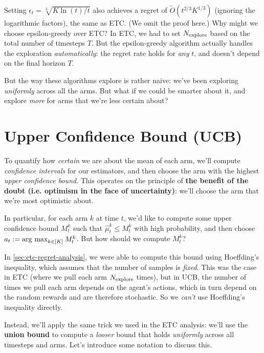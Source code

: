 \documentclass[\main/main]{subfiles}
\begin{document}
Setting $\epsilon_t = \sqrt[3]{K \ln(t)/t}$ also achieves a regret of $\tilde O(t^{2/3} K^{1/3})$ (ignoring the logarithmic factors), the same as ETC. (We omit the proof here.)
Why might we choose epsilon-greedy over ETC?
In ETC, we had to set $N_{\text{explore}}$ based on the total number of timesteps $T$. But the epsilon-greedy algorithm actually handles the exploration \emph{automatically}: the regret rate holds for \emph{any} $t$, and doesn't depend on the final horizon $T$.


But the way these algorithms explore is rather naive: we've been exploring \emph{uniformly} across all the arms. But what if we could be smarter about it, and explore \emph{more} for arms that we're less certain about?


\section{Upper Confidence Bound (UCB)}

To quantify how \emph{certain} we are about the mean of each arm, we'll compute \emph{confidence intervals} for our estimators, and then choose the arm with the highest \emph{upper confidence bound}. This operates on the principle of \textbf{the benefit of the doubt (i.e. optimism in the face of uncertainty)}: we'll choose the arm that we're most optimistic about.

In particular, for each arm $k$ at time $t$, we'd like to compute some upper confidence bound $M^k_t$ such that $\hat \mu^k_t \le M^k_t$ with high probability, and then choose $a_t := \operatorname*{\textrm{arg\ max}}_{k \in [K]} M^k_t$. But how should we compute $M^k_t$?

In \autoref{sec:etc-regret-analysis}, we were able to compute this bound using Hoeffding's inequality, which assumes that the number of samples is \emph{fixed}. This was the case in ETC (where we pull each arm $N_{\text{explore}}$ times), but in UCB, the number of times we pull each arm depends on the agent's actions, which in turn depend on the random rewards and are therefore stochastic. So we \emph{can't} use Hoeffding's inequality directly.

Instead, we'll apply the same trick we used in the ETC analysis: we'll use the \textbf{union bound} to compute a \emph{looser} bound that holds \emph{uniformly} across all timesteps and arms. Let's introduce some notation to discuss this.
\end{document}
